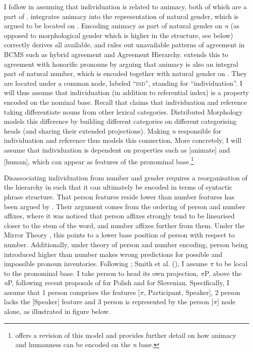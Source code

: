 \documentclass[output=paper,colorlinks,citecolor=brown]{langscibook}
\begin{document}
I follow \citet{puskarsyntax,puskarglossapredicate} in assuming that individuation is related to animacy, both of which are a part of \n. \citet{puskarsyntax} integrates animacy into the representation of natural gender, which is argued to be located on \n. Encoding animacy as part of natural gender on \textit{n} (as opposed to morphological gender which is higher in the structure, see below) correctly derives all available, and rules out unavailable patterns of agreement in BCMS such as hybrid agreement and  Agreement Hierarchy. \citet{puskarglossapredicate} extends this to agreement with honorific pronouns by arguing that animacy is also an integral part of natural number, which is encoded together with natural gender on \n. They are located under a common node, labeled ``\textsc{ind}'', standing for ``individuation''. I will thus assume that individuation (in addition to referential index) is a property encoded on the nominal base. Recall that \citet[94-189]{baker03} claims that individuation and reference taking differentiate nouns from other lexical categories. Distributed Morphology models this difference by building different categories on different categorising heads (and sharing their extended projections). Making \textit{n} responsible for individuation and reference thus models this connection. More concretely, I will assume that individuation is dependent on properties such as [animate] and [human], which can appear as features of the pronominal base.\footnote{\citet{puskargallienpronouns} offers a revision of this model and provides further detail on how animacy and humanness can be encoded on the \textit{n} base.} 

Disassociating individuation from number and gender requires a reorganisation of the hierarchy in  such that it can ultimately be encoded in terms of syntactic phrase structure.
That person features reside lower than number features has been argued by \citet{noyer-diss,trommer02,harbourpersp07,harbour08phi,harbour16,arreginevins12}. Their argument comes from the ordering of person and number affixes, where it was noticed that person affixes strongly tend to be linearised closer to the stem of the word, and number affixes further from them. Under the Mirror Theory \citep{baker-mirror85,brody00,brodyszabolcsi}, this points to a lower base position of person with respect to number. Additionally, under  theory of person and number encoding, person being introduced higher than number makes wrong predictions for possible and impossible pronoun inventories. 
Following \citet{vanurkpronouns}; Smith et al. (\citeyear{smithetal18}), I assume $\pi$ to be local to the pronominal base. I take person to head its own projection, $\pi$P, above the \textit{n}P, following recent proposals of \citet{ruda21pronounstructure} for Polish and \citet{stegovec19} for Slovenian. Specifically, I assume that 1\fst{} person comprises the features [$\pi$, Participant, Speaker], 2\nd{} person lacks the [Speaker] feature and 3\rd{} person is represented by the person [$\pi$] node alone, as illustrated in figure  below. 
\end{document}
